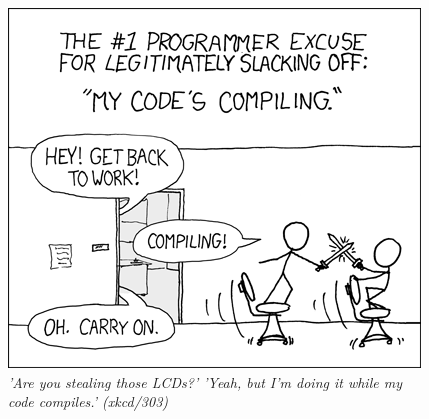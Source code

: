 \begin{figure}[h!]
\centering \includegraphics[width=\linewidth]{img/xkcd/compiling.png}
\caption*{{\small \textit{'Are you stealing those LCDs?' 'Yeah, but I'm doing it while my code compiles.' (xkcd/303)}}}
\end{figure}
